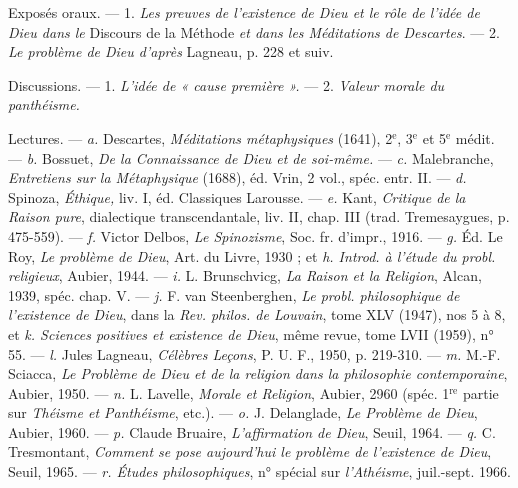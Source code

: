 Exposés oraux. — 1. {\it Les preuves de l'existence de Dieu et le rôle de l'idée
de Dieu dans le} Discours de la Méthode {\it et dans les Méditations de Descartes}.
— 2. {\it Le problème de Dieu d'après} Lagneau, p. 228 et suiv.

Discussions. — 1. {\it L'idée de « cause première ».} — 2. {\it Valeur morale du
panthéisme.}

Lectures. — {\it a.} Descartes, {\it Méditations métaphysiques} (1641), 2$^\text{e}$, 3$^\text{e}$ et
5$^\text{e}$ médit. — {\it b.} Bossuet, {\it De la Connaissance de Dieu et de soi-même.} —
{\it c.} Malebranche, {\it Entretiens sur la Métaphysique} (1688), éd. Vrin, 2 vol.,
spéc. entr. II. — {\it d.} Spinoza, {\it Éthique,} liv. I, éd. Classiques Larousse. —
{\it e.} Kant, {\it Critique de la Raison pure}, dialectique transcendantale, liv. II,
chap. III (trad. Tremesaygues, p. 475-559). — {\it f.} Victor Delbos, {\it Le Spinozisme},
Soc. fr. d’impr., 1916. — {\it g.} Éd. Le Roy, {\it Le problème de Dieu}, Art.
du Livre, 1930 ; et {\it h. Introd. à l'étude du probl. religieux}, Aubier, 1944. —
{\it i.} L. Brunschvicg, {\it La Raison et la Religion}, Alcan, 1939, spéc. chap. V. —
{\it j.} F. van Steenberghen, {\it Le probl. philosophique de l'existence de Dieu}, dans
la {\it Rev. philos. de Louvain}, tome XLV (1947), nos 5 à 8, et {\it k. Sciences positives
et existence de Dieu}, même revue, tome LVII (1959), n° 55. — {\it l.} Jules
Lagneau, {\it Célèbres Leçons}, P. U. F., 1950, p. 219-310. — {\it m.} M.-F. Sciacca,
{\it Le Problème de Dieu et de la religion dans la philosophie contemporaine},
Aubier, 1950. — {\it n.} L. Lavelle, {\it Morale et Religion}, Aubier, 2960 (spéc.
1$^\text{re}$ partie sur {\it Théisme et Panthéisme}, etc.). — {\it o.} J. Delanglade, {\it Le Problème
de Dieu}, Aubier, 1960. — {\it p.} Claude Bruaire, {\it L'affirmation de Dieu},
Seuil, 1964. — {\it q.} C. Tresmontant, {\it Comment se pose aujourd’hui le problème
de l'existence de Dieu}, Seuil, 1965. — {\it r. Études philosophiques}, n° spécial sur
{\it l’Athéisme}, juil.-sept. 1966.
